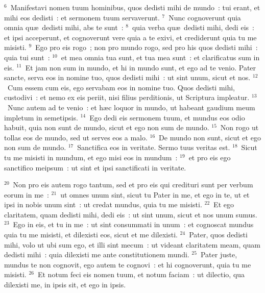 ${}^{6}$~Manifestavi nomen tuum hominibus, quos dedisti mihi de mundo~: tui erant, et mihi eos dedisti~: et sermonem tuum servaverunt.
${}^{7}$~Nunc cognoverunt quia omnia qu\ae\ dedisti mihi, abs te sunt~:
${}^{8}$~quia verba qu\ae\ dedisti mihi, dedi eis~: et ipsi acceperunt, et cognoverunt vere quia a te exivi, et crediderunt quia tu me misisti.
${}^{9}$~Ego pro eis rogo~; non pro mundo rogo, sed pro his quos dedisti mihi~: quia tui sunt~:
${}^{10}$~et mea omnia tua sunt, et tua mea sunt~: et clarificatus sum in eis.
${}^{11}$~Et jam non sum in mundo, et hi in mundo sunt, et ego ad te venio. Pater sancte, serva eos in nomine tuo, quos dedisti mihi~: ut sint unum, sicut et nos.
${}^{12}$~Cum essem cum eis, ego servabam eos in nomine tuo. Quos dedisti mihi, custodivi~: et nemo ex eis periit, nisi filius perditionis, ut Scriptura impleatur.
${}^{13}$~Nunc autem ad te venio~: et h\ae c loquor in mundo, ut habeant gaudium meum impletum in semetipsis.
${}^{14}$~Ego dedi eis sermonem tuum, et mundus eos odio habuit, quia non sunt de mundo, sicut et ego non sum de mundo.
${}^{15}$~Non rogo ut tollas eos de mundo, sed ut serves eos a malo.
${}^{16}$~De mundo non sunt, sicut et ego non sum de mundo.
${}^{17}$~Sanctifica eos in veritate. Sermo tuus veritas est.
${}^{18}$~Sicut tu me misisti in mundum, et ego misi eos in mundum~:
${}^{19}$~et pro eis ego sanctifico meipsum~: ut sint et ipsi sanctificati in veritate.


${}^{20}$~Non pro eis autem rogo tantum, sed et pro eis qui credituri sunt per verbum eorum in me~:
${}^{21}$~ut omnes unum sint, sicut tu Pater in me, et ego in te, ut et ipsi in nobis unum sint~: ut credat mundus, quia tu me misisti.
${}^{22}$~Et ego claritatem, quam dedisti mihi, dedi eis~: ut sint unum, sicut et nos unum sumus.
${}^{23}$~Ego in eis, et tu in me~: ut sint consummati in unum~: et cognoscat mundus quia tu me misisti, et dilexisti eos, sicut et me dilexisti.
${}^{24}$~Pater, quos dedisti mihi, volo ut ubi sum ego, et illi sint mecum~: ut videant claritatem meam, quam dedisti mihi~: quia dilexisti me ante constitutionem mundi.
${}^{25}$~Pater juste, mundus te non cognovit, ego autem te cognovi~: et hi cognoverunt, quia tu me misisti.
${}^{26}$~Et notum feci eis nomen tuum, et notum faciam~: ut dilectio, qua dilexisti me, in ipsis sit, et ego in ipsis.

